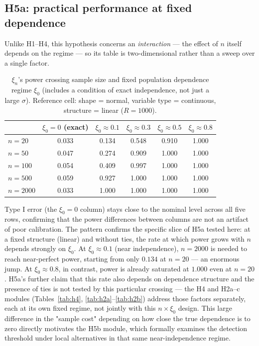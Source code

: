 \documentclass[article]{ajs}
\begin{document}
\subsection{H5a: practical performance at fixed dependence}

Unlike H1--H4, this hypothesis concerns an \emph{interaction} --- the
effect of $n$ itself depends on the regime --- so its table is
two-dimensional rather than a sweep over a single factor.

\begin{table}[H]
\caption{\label{tab:h5a}$\xi_n$'s power crossing sample size and fixed population dependence regime $\xi_0$ (includes a condition of exact independence, not just a large $\sigma$). Reference cell: shape = normal, variable type = continuous, structure = linear ($R=1000$).}
\begin{center}
\begin{tabular}{lccccc}
\toprule
 & $\xi_0 = 0$ (exact) & $\xi_0\approx 0.1$ & $\xi_0\approx 0.3$ & $\xi_0\approx 0.5$ & $\xi_0\approx 0.8$ \\
\midrule
$n=20$   & 0.033 & 0.134 & 0.548 & 0.910 & 1.000 \\
$n=50$   & 0.047 & 0.274 & 0.909 & 1.000 & 1.000 \\
$n=100$  & 0.054 & 0.409 & 0.997 & 1.000 & 1.000 \\
$n=500$  & 0.059 & 0.927 & 1.000 & 1.000 & 1.000 \\
$n=2000$ & 0.033 & 1.000 & 1.000 & 1.000 & 1.000 \\
\bottomrule
\end{tabular}
\end{center}
\end{table}

Type I error (the $\xi_0=0$ column) stays close to the nominal level
across all five rows, confirming that the power differences between
columns are not an artifact of poor calibration. The pattern confirms the specific slice of H5a tested here: at a fixed
structure (linear) and without ties, the rate at which power grows
with $n$ depends strongly on $\xi_0$. At $\xi_0\approx 0.1$ (near
independence), $n=2000$ is needed to reach near-perfect power, starting
from only $0.134$ at $n=20$ --- an enormous jump. At $\xi_0\approx 0.8$,
in contrast, power is already saturated at $1.000$ even at $n=20$.
H5a's further claim that this rate also depends on dependence structure
and the presence of ties is not tested by this particular crossing ---
the H4 and H2a--c modules (Tables~\ref{tab:h4}, \ref{tab:h2a}--\ref{tab:h2b})
address those factors separately, each at its own fixed regime, not
jointly with this $n\times\xi_0$ design. This large difference in the
"sample cost" depending on how close the true dependence is to zero
directly motivates the H5b module, which formally examines the
detection threshold under local alternatives in that same
near-independence regime.
\end{document}
